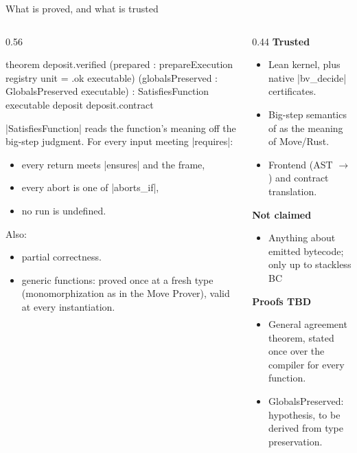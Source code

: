 \documentclass[aspectratio=169,11pt]{beamer}
\begin{document}
\begin{frame}[fragile]{What is proved, and what is trusted}
  \begin{columns}[T]
    \begin{column}{0.56\textwidth}
\begin{LeanSmall}
theorem deposit.verified
    (prepared : prepareExecution registry unit
                  = .ok executable)
    (globalsPreserved : GlobalsPreserved executable) :
    SatisfiesFunction executable deposit
      deposit.contract
\end{LeanSmall}
      \scriptsize
      |SatisfiesFunction| reads the function's meaning off the big-step judgment.
      For every input meeting |requires|:
      \begin{itemize}\setlength{\itemsep}{0pt}
        \item every return meets |ensures| and the frame,
        \item every abort is one of |aborts_if|,
        \item no run is undefined.
      \end{itemize}
      Also:
      \begin{itemize}\setlength{\itemsep}{0pt}
        \item partial correctness. 
        \item generic functions: proved once at a fresh type (monomorphization as in the Move Prover), valid at every instantiation.
      \end{itemize}
    \end{column}
    \begin{column}{0.44\textwidth}
      \textbf{Trusted}
      \begin{itemize}\setlength{\itemsep}{1pt}\scriptsize
        \item Lean kernel, plus native |bv_decide| certificates.
        \item Big-step semantics of \LIR as the meaning of Move/Rust.
        \item Frontend (AST $\to$ \LIR) and contract translation.
      \end{itemize}
      \textbf{Not claimed}
      \begin{itemize}\scriptsize
        \item Anything about emitted bytecode; only up to stackless BC
      \end{itemize}
      \textbf{Proofs TBD}
      \begin{itemize}\scriptsize
        \item General agreement theorem, stated once over the compiler for every function.
        \item GlobalsPreserved: hypothesis, to be derived from type preservation.
      \end{itemize}
    \end{column}
  \end{columns}
\end{frame}
\end{document}
